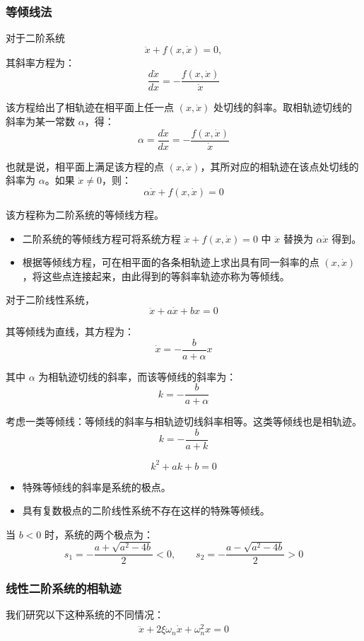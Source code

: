 \subsubsection{等倾线法}
对于二阶系统
\[
\ddot{x}+f(x,\dot{x})=0,
\]
其斜率方程为：
\[
\frac{d\dot{x}}{dx}=-\frac{f(x,\dot{x})}{\dot{x}}
\]

该方程给出了相轨迹在相平面上任一点 $(x,\dot{x})$ 处切线的斜率。取相轨迹切线的斜率为某一常数 $\alpha$，得：
\[
\alpha=\frac{d\dot{x}}{dx}=-\frac{f(x,\dot{x})}{\dot{x}}
\]

也就是说，相平面上满足该方程的点 $(x,\dot{x})$，其所对应的相轨迹在该点处切线的斜率为 $\alpha$。如果 $\dot{x}\neq 0$，则：
\[
\alpha\dot{x}+f(x,\dot{x})=0
\]

该方程称为二阶系统的等倾线方程。

\begin{itemize}
    \item 二阶系统的等倾线方程可将系统方程 $\ddot{x}+f(x,\dot{x})=0$ 中 $\ddot{x}$ 替换为 $\alpha\dot{x}$ 得到。
    \item 根据等倾线方程，可在相平面的各条相轨迹上求出具有同一斜率的点 $(x,\dot{x})$，将这些点连接起来，由此得到的等斜率轨迹亦称为等倾线。
\end{itemize}

对于二阶线性系统，
\[
\ddot{x}+a\dot{x}+bx=0
\]

其等倾线为直线，其方程为：
\[
\dot{x}=-\frac{b}{a+\alpha}x
\]

其中 $\alpha$ 为相轨迹切线的斜率，而该等倾线的斜率为：
\[
k=-\frac{b}{a+\alpha}
\]

考虑一类等倾线：等倾线的斜率与相轨迹切线斜率相等。这类等倾线也是相轨迹。
\[
k=-\frac{b}{a+k}
\]

\[
k^2+ak+b=0
\]

\begin{itemize}
    \item 特殊等倾线的斜率是系统的极点。
    \item 具有复数极点的二阶线性系统不存在这样的特殊等倾线。
\end{itemize}

当 $b<0$ 时，系统的两个极点为：
\[
s_1=-\frac{a+\sqrt{a^2-4b}}{2}<0,
\qquad
s_2=-\frac{a-\sqrt{a^2-4b}}{2}>0
\]

\subsubsection{线性二阶系统的相轨迹}

我们研究以下这种系统的不同情况：
\begin{align*}
    \ddot{x} + 2 \xi \omega_n \dot{x} + \omega_n^2 x = 0
\end{align*}

